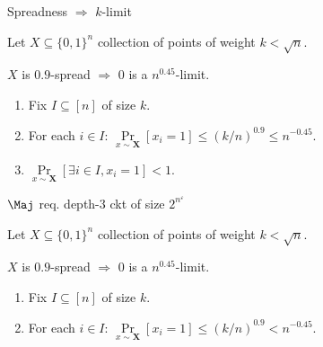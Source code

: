 \begin{frame}{Spreadness $\Rightarrow$ $k$-limit}

    Let $X \subseteq \{0, 1\}^n$ collection of points of weight $k < \sqrt{n}$.
    
    \begin{lemma}    
        $X$ is $0.9$-spread $\Rightarrow$ $0$ is a $n^{0.45}$-limit.
    \end{lemma}

    \pause

    \begin{enumerate}
        \item Fix $I \subseteq [n]$ of size $k$.
        \item For each $i \in I$: $\Pr\limits_{x \sim \mathbf{X}}[x_i = 1] \le \left( k / n \right)^{0.9}
            \le n^{-0.45}$.
            \pause
        \item $\Pr\limits_{x \sim \mathbf{X}}[\exists i \in I, x_i = 1] < 1$.
    \end{enumerate}
    
\end{frame}


\begin{frame}{$\Maj$ req. depth-$3$ ckt of size $2^{n^{\varepsilon}}$}

    
    
    Let $X \subseteq \{0, 1\}^n$ collection of points of weight $k < \sqrt{n}$.
    
    \begin{lemma}    
        $X$ is $0.9$-spread $\Rightarrow$ $0$ is a $n^{0.45}$-limit.
    \end{lemma}

    \pause

    \begin{enumerate}
        \item Fix $I \subseteq [n]$ of size $k$.
        \item For each $i \in I$: $\Pr\limits_{x \sim \mathbf{X}}[x_i = 1] \le \left( k / n \right)^{0.9}
            < n^{-0.45}$.
  
    \end{enumerate}
    
\end{frame}